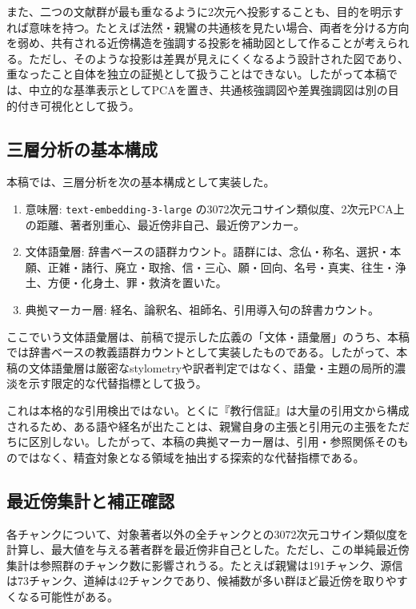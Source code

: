 \documentclass[uplatex,dvipdfmx,11pt,a4paper]{jsarticle}
\begin{document}
また、二つの文献群が最も重なるように2次元へ投影することも、目的を明示すれば意味を持つ。たとえば法然・親鸞の共通核を見たい場合、両者を分ける方向を弱め、共有される近傍構造を強調する投影を補助図として作ることが考えられる。ただし、そのような投影は差異が見えにくくなるよう設計された図であり、重なったこと自体を独立の証拠として扱うことはできない。したがって本稿では、中立的な基準表示としてPCAを置き、共通核強調図や差異強調図は別の目的付き可視化として扱う。

\subsection{三層分析の基本構成}

本稿では、三層分析を次の基本構成として実装した。

\begin{enumerate}
  \item 意味層: \texttt{text-embedding-3-large} の3072次元コサイン類似度、2次元PCA上の距離、著者別重心、最近傍非自己、最近傍アンカー。
  \item 文体語彙層: 辞書ベースの語群カウント。語群には、念仏・称名、選択・本願、正雑・諸行、廃立・取捨、信・三心、願・回向、名号・真実、往生・浄土、方便・化身土、罪・救済を置いた。
  \item 典拠マーカー層: 経名、論釈名、祖師名、引用導入句の辞書カウント。
\end{enumerate}

ここでいう文体語彙層は、前稿で提示した広義の「文体・語彙層」のうち、本稿では辞書ベースの教義語群カウントとして実装したものである。したがって、本稿の文体語彙層は厳密なstylometryや訳者判定ではなく、語彙・主題の局所的濃淡を示す限定的な代替指標として扱う。

これは本格的な引用検出ではない。とくに『教行信証』は大量の引用文から構成されるため、ある語や経名が出たことは、親鸞自身の主張と引用元の主張をただちに区別しない。したがって、本稿の典拠マーカー層は、引用・参照関係そのものではなく、精査対象となる領域を抽出する探索的な代替指標である。

\subsection{最近傍集計と補正確認}

各チャンクについて、対象著者以外の全チャンクとの3072次元コサイン類似度を計算し、最大値を与える著者群を最近傍非自己とした。ただし、この単純最近傍集計は参照群のチャンク数に影響されうる。たとえば親鸞は191チャンク、源信は73チャンク、道綽は42チャンクであり、候補数が多い群ほど最近傍を取りやすくなる可能性がある。
\end{document}
